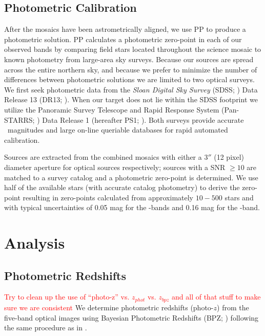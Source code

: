 \documentclass[apj, revtex4-1]{emulateapj}
\newcommand{\editorial}[1]{\textcolor{red}{#1}}
\begin{document}
\subsection{Photometric Calibration}
After the mosaics have been astrometrically aligned, we use PP to produce a photometric solution. PP calculates a photometric zero-point in each of our observed bands by comparing field stars located throughout the science mosaic to known photometry from large-area sky surveys. Because our sources are spread across the entire northern sky, and because we prefer to minimize the number of differences between photometric solutions we are limited to two optical surveys. We first seek photometric data from the \textit{Sloan Digital Sky Survey} (SDSS; \citealt{York2000}) Data Release 13 (DR13; \citealt{Albareti2017}). When our target does not lie within the SDSS footprint we utilize the Panoramic Survey Telescope and Rapid Response System (Pan-STARRS; \citealt{Chambers2016}) Data Release 1 (hereafter PS1; \citealt{Flewelling2016}). Both surveys provide accurate \sdssg\sdssr\sdssi\sdssz\ magnitudes and large on-line queriable databases for rapid automated calibration.

Sources are extracted from the combined mosaics with either a $3''$ (12 pixel) diameter aperture for optical sources respectively; sources with a SNR $\ge10$ are matched to a survey catalog and a photometric zero-point is determined. We use half of the available stars (with accurate catalog photometry) to derive the zero-point resulting in zero-points calculated from approximately $10-500$ stars and with typical uncertainties of 0.05 mag for the \sdssg\sdssr\sdssi-bands and 0.16 mag for the \sdssz-band.

\section{Analysis}\label{sec:analysis}
\subsection{Photometric Redshifts}
\editorial{Try to clean up the use of ``photo-z'' vs. $z_{phot}$ vs. $z_{bpz}$ and all of that stuff to make sure we are consistent}
We determine photometric redshifts (photo-$z$) from the five-band optical images using Bayesian Photometric Redshifts (BPZ; \citealt{Benitez2000, Coe2006}) following the same procedure as in \cite{Menanteau2009a}.
\end{document}

